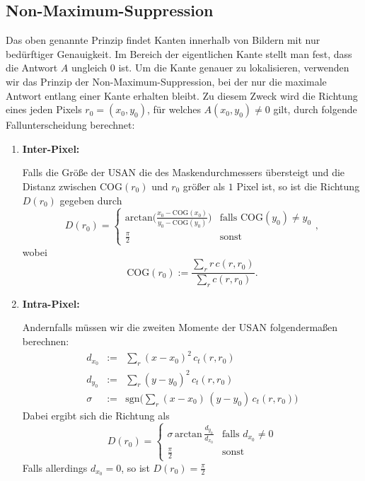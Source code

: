 \documentclass[a4paper, 11pt]{report}
\theoremstyle{definition}
\begin{document}
		\subsection{Non-Maximum-Suppression}\label{ssec:nonmax}
		Das oben genannte Prinzip findet Kanten innerhalb von Bildern mit nur bedürftiger Genauigkeit. Im Bereich der eigentlichen Kante stellt man fest, dass die Antwort $A$ ungleich $0$ ist.
		Um die Kante genauer zu lokalisieren, verwenden wir das Prinzip der Non-Maximum-Suppression, bei der nur die maximale Antwort entlang einer Kante erhalten bleibt.
		Zu diesem Zweck wird die Richtung eines jeden Pixels $r_0 = (x_0, y_0)$, für welches $A(x_0, y_0) \neq 0$ gilt, durch folgende Fallunterscheidung berechnet:
		\begin{enumerate}
			\item \textbf{Inter-Pixel:}

			\noindent Falls die Größe der USAN die des Maskendurchmessers übersteigt und die Distanz zwischen $\text{COG}(r_0)$ und $r_0$ größer als $1$ Pixel ist, so ist die Richtung $D(r_0)$ gegeben durch
			$$ D(r_0) = \begin{cases}
				\text{arctan}\bigg(
					\frac{x_0 - \text{COG}(x_0)}
					{y_0 - \text{COG}(y_0)}
				\bigg) & \text{falls } \text{COG}(y_0) \neq y_0 \\
				
				\frac{\pi}{2} & \text{sonst}

			\end{cases}, $$
			wobei
			$$ \text{COG}(r_0) := \frac	{\sum_r r\,c(r,r_0)}	{\sum_r c(r,r_0)}. $$
			\item \textbf{Intra-Pixel:}
			
			\noindent Andernfalls müssen wir die zweiten Momente der USAN folgendermaßen berechnen:
			\begin{eqnarray*}
				d_{x_0} &:=& \sum_r (x-x_0)^2 \, c_t(r,r_0) \\
				d_{y_0} &:=& \sum_r (y-y_0)^2 \, c_t(r,r_0) \\
				\sigma 	&:=& \text{sgn}\bigg(\sum_r (x-x_0) \, (y-y_0) \, c_t(r,r_0)\bigg)
			\end{eqnarray*}
			Dabei ergibt sich die Richtung als
			$$ D(r_0) = \begin{cases}
					\sigma \, \text{arctan} \, \frac{d_{y_0}}{d_{x_0}} 	&	\text{falls } d_{x_0} \neq 0 \\ 
					\frac{\pi}{2}										&	\text{sonst}
				\end{cases}$$
			Falls allerdings $d_{x_0} = 0$, so ist $D(r_0) = \frac{\pi}{2}$
		\end{enumerate}
\end{document}
